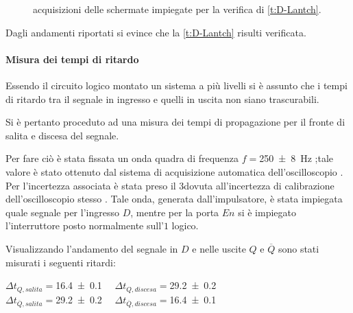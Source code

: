 \begin{figure}[htb]
{			\label{f:sci}
		}
		\caption{acquisizioni delle schermate impiegate per la verifica di \tablename{ \ref{t:D-Lantch}}.}
		\label{o:D-Latch}
	\end{figure}
	Dagli andamenti riportati si evince che la \tablename{ \ref{t:D-Lantch}}
	risulti verificata.
\paragraph{Misura dei tempi di ritardo}
	Essendo il circuito logico montato un sistema a più livelli
	si è assunto che i tempi di ritardo tra il segnale in ingresso e quelli in uscita non siano trascurabili.
	
	Si è pertanto proceduto ad una misura dei tempi di propagazione per il fronte di salita e discesa del segnale.
	
	Per fare ciò è stata fissata un onda quadra di frequenza $f=$\SI{250\pm 8}{\hertz} ;tale valore è stato ottenuto dal sistema di acquisizione automatica dell'oscilloscopio . Per l'incertezza associata  è stata preso il 3\textdiscount dovuta all'incertezza di calibrazione dell'oscilloscopio stesso .	
	Tale onda, generata dall'impulsatore, è stata impiegata quale  segnale per l'ingresso $D$, mentre per la porta $En$ si è impiegato l'interruttore  posto normalmente sull'$1$ logico.
	
	Visualizzando l'andamento del segnale in $D$ e nelle uscite $Q$ e $\overline{Q}$
	sono stati misurati i seguenti ritardi:\\
	\begin{center}
		$ \Delta t_{Q,salita}=$\SI{16.4 \pm 0.1}{\nano \sec} \qquad $ \Delta t_{Q,discesa}=$\SI{29.2 \pm 0.2}{\nano \sec}\\
			$ \Delta t_{\overline{Q},salita}=$\SI{29.2 \pm 0.2}{\nano \sec} \qquad $ \Delta t_{\overline{Q},discesa}=$\SI{16.4 \pm 0.1}{\nano \sec}\\
	\end{center}
	
